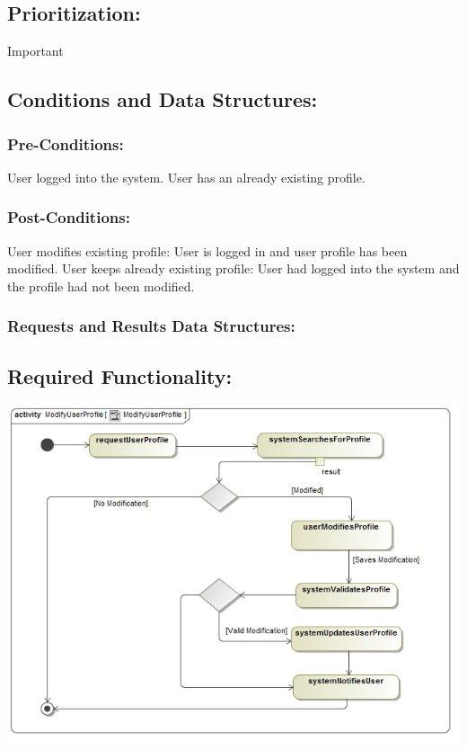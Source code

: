 \documentclass[a4paper,11pt]{article}
\begin{document}
\subsection{Prioritization:}
\textbf{}Important
\subsection{Conditions and Data Structures:}
\subsubsection*{Pre-Conditions:}
\textbf{}User logged into the system. 
\textbf{}User has an already existing profile. 
\subsubsection*{Post-Conditions:}
\textbf{}User modifies existing profile: User is logged in and user profile has been modified. 
\textbf{}User keeps already existing profile: User had logged into the system and the profile had not been modified. 
\subsubsection*{Requests and Results Data Structures:}
\subsection{Required Functionality:}
\includegraphics{Images/UserProfile/ModifyUserProfile}
\end{document}
